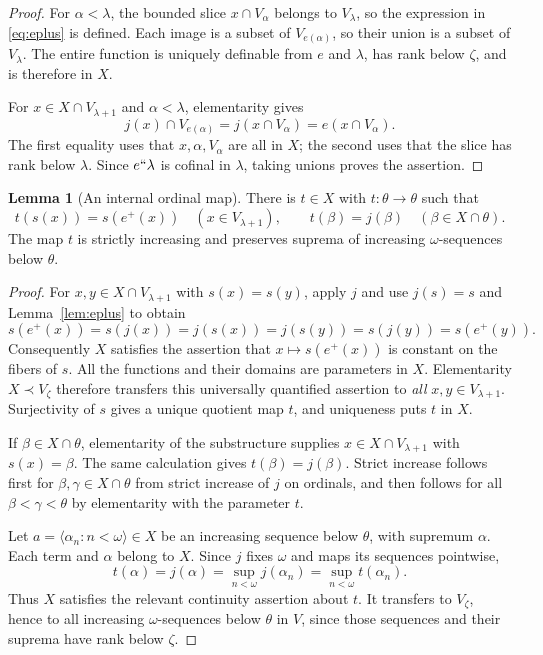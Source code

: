 \documentclass[11pt,letterpaper]{article}
\theoremstyle{definition}
\newtheorem{lemma}[definition]{Lemma}
\numberwithin{equation}{section}
\begin{document}
\begin{proof}
For $\alpha<\lambda$, the bounded slice $x\cap V_\alpha$ belongs to $V_\lambda$, so the expression in \eqref{eq:eplus} is defined. Each image is a subset of $V_{e(\alpha)}$, so their union is a subset of $V_\lambda$. The entire function is uniquely definable from $e$ and $\lambda$, has rank below $\zeta$, and is therefore in $X$.

For $x\in X\cap V_{\lambda+1}$ and $\alpha<\lambda$, elementarity gives
\[
j(x)\cap V_{e(\alpha)}
=j(x\cap V_\alpha)
=e(x\cap V_\alpha).
\]
The first equality uses that $x,\alpha,V_\alpha$ are all in $X$; the second uses that the slice has rank below $\lambda$. Since $e``\lambda$ is cofinal in $\lambda$, taking unions proves the assertion.
\end{proof}

\begin{lemma}[An internal ordinal map]\label{lem:t}
There is $t\in X$ with $t:\theta\to\theta$ such that
\begin{equation}\label{eq:t}
t(s(x))=s(e^+(x))\quad(x\in V_{\lambda+1}),
\qquad
t(\beta)=j(\beta)\quad(\beta\in X\cap\theta).
\end{equation}
The map $t$ is strictly increasing and preserves suprema of increasing $\omega$-sequences below $\theta$.
\end{lemma}

\begin{proof}
For $x,y\in X\cap V_{\lambda+1}$ with $s(x)=s(y)$, apply $j$ and use $j(s)=s$ and Lemma~\ref{lem:eplus} to obtain
\[
s(e^+(x))=s(j(x))=j(s(x))=j(s(y))=s(j(y))=s(e^+(y)).
\]
Consequently $X$ satisfies the assertion that $x\mapsto s(e^+(x))$ is constant on the fibers of $s$. All the functions and their domains are parameters in $X$. Elementarity $X\prec V_\zeta$ therefore transfers this universally quantified assertion to \emph{all} $x,y\in V_{\lambda+1}$. Surjectivity of $s$ gives a unique quotient map $t$, and uniqueness puts $t$ in $X$.

If $\beta\in X\cap\theta$, elementarity of the substructure supplies $x\in X\cap V_{\lambda+1}$ with $s(x)=\beta$. The same calculation gives $t(\beta)=j(\beta)$. Strict increase follows first for $\beta,\gamma\in X\cap\theta$ from strict increase of $j$ on ordinals, and then follows for all $\beta<\gamma<\theta$ by elementarity with the parameter $t$.

Let $a=\langle\alpha_n:n<\omega\rangle\in X$ be an increasing sequence below $\theta$, with supremum $\alpha$. Each term and $\alpha$ belong to $X$. Since $j$ fixes $\omega$ and maps its sequences pointwise,
\[
t(\alpha)=j(\alpha)=\sup_{n<\omega}j(\alpha_n)
=\sup_{n<\omega}t(\alpha_n).
\]
Thus $X$ satisfies the relevant continuity assertion about $t$. It transfers to $V_\zeta$, hence to all increasing $\omega$-sequences below $\theta$ in $V$, since those sequences and their suprema have rank below $\zeta$.
\end{proof}
\end{document}
